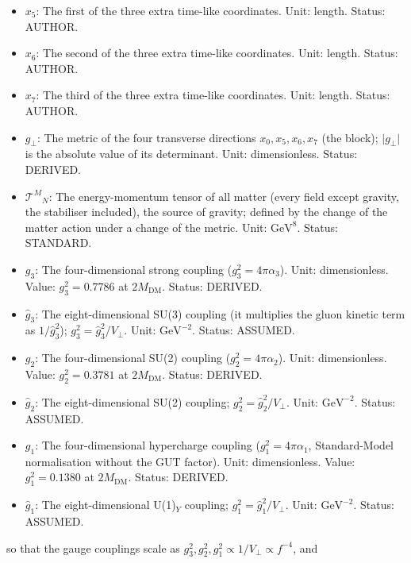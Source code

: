 \documentclass[
  10pt,
]{article}
\begin{document}
\begin{itemize}
  \(x_0\): The hidden space-like coordinate (listed first); the metric
  depends on it through \(z = 6Hx_0\), periodically with the period
  \(\pi/(6H)\). Unit: length. Status: AUTHOR.
\item
  \(x_5\): The first of the three extra time-like coordinates. Unit:
  length. Status: AUTHOR.
\item
  \(x_6\): The second of the three extra time-like coordinates. Unit:
  length. Status: AUTHOR.
\item
  \(x_7\): The third of the three extra time-like coordinates. Unit:
  length. Status: AUTHOR.
\item
  \(g_\perp\): The metric of the four transverse directions
  \(x_0, x_5, x_6, x_7\) (the block); \(\lvert g_\perp\rvert\) is the
  absolute value of its determinant. Unit: dimensionless. Status:
  DERIVED.
\item
  \(\mathcal{T}^M{}_N\): The energy-momentum tensor of all matter (every
  field except gravity, the stabiliser included), the source of gravity;
  defined by the change of the matter action under a change of the
  metric. Unit: \(\mathrm{GeV}^{8}\). Status: STANDARD.
\item
  \(g_3\): The four-dimensional strong coupling
  (\(g_3^2 = 4\pi\alpha_3\)). Unit: dimensionless. Value:
  \(g_3^2 = 0.7786\) at \(2M_{\mathrm{DM}}\). Status: DERIVED.
\item
  \(\hat g_3\): The eight-dimensional SU(3) coupling (it multiplies the
  gluon kinetic term as \(1/\hat g_3^2\));
  \(g_3^2 = \hat g_3^2/V_\perp\). Unit: \(\mathrm{GeV}^{-2}\). Status:
  ASSUMED.
\item
  \(g_2\): The four-dimensional SU(2) coupling
  (\(g_2^2 = 4\pi\alpha_2\)). Unit: dimensionless. Value:
  \(g_2^2 = 0.3781\) at \(2M_{\mathrm{DM}}\). Status: DERIVED.
\item
  \(\hat g_2\): The eight-dimensional SU(2) coupling;
  \(g_2^2 = \hat g_2^2/V_\perp\). Unit: \(\mathrm{GeV}^{-2}\). Status:
  ASSUMED.
\item
  \(g_1\): The four-dimensional hypercharge coupling
  (\(g_1^2 = 4\pi\alpha_1\), Standard-Model normalisation without the
  GUT factor). Unit: dimensionless. Value: \(g_1^2 = 0.1380\) at
  \(2M_{\mathrm{DM}}\). Status: DERIVED.
\item
  \(\hat g_1\): The eight-dimensional U(1)\(_Y\) coupling;
  \(g_1^2 = \hat g_1^2/V_\perp\). Unit: \(\mathrm{GeV}^{-2}\). Status:
  ASSUMED.
\end{itemize}

so that the gauge couplings scale as
\(g_3^2, g_2^2, g_1^2 \propto 1/V_\perp \propto f^{-4}\), and
\end{document}
